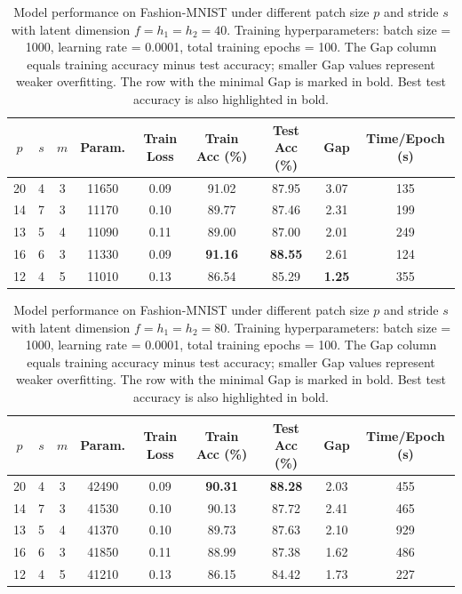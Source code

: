 \documentclass[pdflatex,sn-mathphys-num]{sn-jnl}%
\theoremstyle{thmstyleone}%
\theoremstyle{thmstyletwo}%
\theoremstyle{thmstylethree}%
\begin{document}
\begin{table}[htbp]
  \centering
  
  \caption{Model performance on Fashion-MNIST under different patch size $p$ and stride $s$ with latent dimension $f=h_1=h_2=40$. Training hyperparameters: batch size = 1000, learning rate = 0.0001, total training epochs = 100. The Gap column equals training accuracy minus test accuracy; smaller Gap values represent weaker overfitting. The row with the minimal Gap is marked in bold. Best test accuracy is also highlighted in bold.}
  \label{tab:15}
  \begin{tabular}{ccccccccc}
    \toprule
    $p$ & $s$ & $m$ & Param. & Train Loss & Train Acc (\%) & Test Acc (\%) & Gap & Time/Epoch (s) \\
    \midrule
 20 & 4 & 3 & 11650 & 0.09 & 91.02 & 87.95 & 3.07 & 135  \\
 14 & 7 & 3 & 11170 & 0.10 & 89.77 & 87.46 & 2.31 & 199\\
 13 & 5 & 4 & 11090 & 0.11 & 89.00 & 87.00 & 2.01 & 249 \\
 16 & 6 & 3 & 11330 & 0.09 & \textbf{91.16} & \textbf{88.55} & 2.61 & 124 \\
 12 & 4 & 5 & 11010 & 0.13 & 86.54 & 85.29 & \textbf{1.25} & 355 \\
    \bottomrule
  \end{tabular}
\end{table}

\begin{table}[htbp]
  \centering

  \caption{Model performance on Fashion-MNIST under different patch size $p$ and stride $s$ with latent dimension $f=h_1=h_2=80$. Training hyperparameters: batch size = 1000, learning rate = 0.0001, total training epochs = 100. The Gap column equals training accuracy minus test accuracy; smaller Gap values represent weaker overfitting. The row with the minimal Gap is marked in bold. Best test accuracy is also highlighted in bold.}
  \label{tab:16}
  \begin{tabular}{ccccccccc}
    \toprule
    $p$ & $s$ & $m$ & Param. & Train Loss & Train Acc (\%) & Test Acc (\%) & Gap & Time/Epoch (s) \\
    \midrule
    20 & 4 & 3 & 42490 & 0.09 & \textbf{90.31} & \textbf{88.28} & 2.03 & 455\\
    14 & 7 & 3 & 41530 & 0.10 & 90.13 & 87.72 & 2.41 & 465 \\
    13 & 5 & 4 & 41370 & 0.10 & 89.73 & 87.63 & 2.10 & 929\\
    16 & 6 & 3 & 41850 & 0.11 & 88.99 & 87.38 & 1.62 & 486\\
    12 & 4 & 5 & 41210 & 0.13 & 86.15 & 84.42 & 1.73 & 227\\
    \bottomrule
  \end{tabular}
\end{table}
\end{document}
